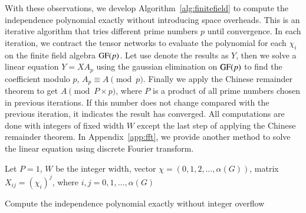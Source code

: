 \documentclass[onefignum, onetabnum]{siamart190516}
\newcommand{\<}{\langle}
\renewcommand{\>}{\rangle}
\newcommand{\App}[1]{Appendix~\ref{#1}}
\begin{document}
With these observations, we develop Algorithm~\ref{alg:finitefield} to compute the independence polynomial exactly without introducing space overheads.
This is an iterative algorithm that tries different prime numbers $p$ until convergence.
In each iteration, we contract the tensor networks to evaluate the polynomial for each $\chi_{i}$ on the finite field algebra ${\rm GF}(p)$.
Let use denote the results as $Y$, then we solve a linear equation $Y = X A_p$ using the gaussian elimination on ${\rm GF}(p)$ to find the coefficient modulo $p$, $A_p \equiv A \pmod p$.
Finally we apply the Chinese remainder theorem to get $A \pmod {P\times p}$, where $P$ is a product of all prime numbers chosen in previous iterations.
If this number does not change compared with the previous iteration, it indicates the result has converged.
All computations are done with integers of fixed width $W$ except the last step of applying the Chinese remainder theorem.
In \App{app:fft}, we provide another method to solve the linear equation using discrete Fourier transform.

\LinesNumberedHidden
\begin{algorithm}[!ht]
    \small
    \SetAlgoNoLine
    Let $P = 1$, $W$ be the integer width, vector $\chi = (0,1,2, \ldots, \alpha(G))$, matrix $X_{ij} = (\chi_i)^j$, where $i,j = 0, 1, \ldots, \alpha(G)$\;

    \caption{Compute the independence polynomial exactly without integer overflow}\label{alg:finitefield} 
\end{algorithm}
\end{document}
